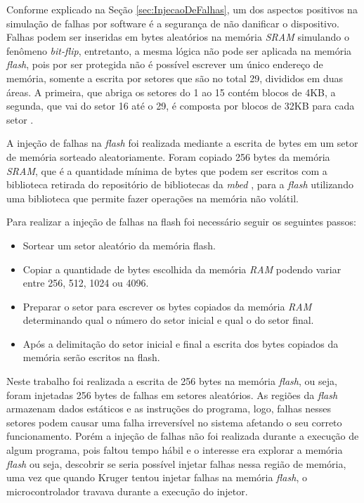 Conforme explicado na Seção \ref{sec:InjecaoDeFalhas}, um dos aspectos positivos na simulação de falhas por software é a segurança de não danificar o dispositivo. Falhas podem ser inseridas em bytes aleatórios na memória \textit{SRAM} simulando o fenômeno \textit{bit-flip}, entretanto, a mesma lógica não pode ser aplicada na memória \textit{flash}, pois por ser protegida não é possível escrever um único endereço de memória, somente a escrita por setores que são no total 29, divididos em duas áreas. A primeira, que abriga os setores do 1 ao 15 contém blocos de 4KB, a segunda, que vai do setor 16 até o 29, é composta por blocos de 32KB para cada setor \cite{manualLpc176x:2016}.

A injeção de falhas na \textit{flash} foi realizada mediante a escrita de bytes em um setor de memória sorteado aleatoriamente. Foram copiado 256 bytes da memória \textit{SRAM}, que é a quantidade mínima de bytes que podem ser escritos com a biblioteca retirada do repositório de bibliotecas da \textit{mbed} \cite{escritaNaFlash:2016}, para a \textit{flash} utilizando uma biblioteca que permite fazer operações na memória não volátil. 

Para realizar a injeção de falhas na flash foi necessário seguir os seguintes passos:

\begin{itemize}
	\item Sortear um setor aleatório da memória flash.
	
	\item Copiar a quantidade de bytes escolhida da memória \textit{RAM} podendo variar entre 256, 512, 1024 ou 4096.
	
	\item Preparar o setor para escrever os bytes copiados da memória \textit{RAM} determinando qual o número do setor inicial e qual o do setor final.
	
	\item Após a delimitação do setor inicial e final a escrita dos bytes copiados da memória serão escritos na flash.
	
\end{itemize}

Neste trabalho foi realizada a escrita de 256 bytes na memória \textit{flash}, ou seja, foram injetadas 256 bytes de falhas em setores aleatórios. As regiões da \textit{flash} armazenam dados estáticos e as instruções do programa, logo, falhas nesses setores podem causar uma falha irreversível no sistema afetando o seu correto funcionamento. Porém a injeção de falhas não foi realizada durante a execução de algum programa, pois faltou tempo hábil e o interesse era explorar a memória \textit{flash} ou seja, descobrir se seria possível injetar falhas nessa região de memória, uma vez que quando Kruger \cite{Kruger:2014} tentou injetar falhas na memória \textit{flash}, o microcontrolador travava durante a execução do injetor.

